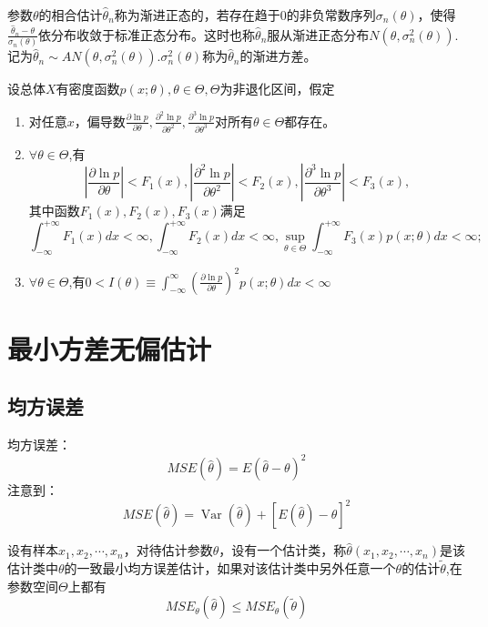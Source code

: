 \begin{definition}
    参数$\theta$的相合估计$\hat{\theta}_n$称为渐进正态的，若存在趋于$0$的非负常数序列$\sigma_n(\theta)$，使得$\frac{\hat{\theta}_n-\theta}{\sigma_n(\theta)}$依分布收敛于标准正态分布。这时也称$\hat{\theta}_n$服从渐进正态分布$N(\theta,\sigma_n^2(\theta))$.记为$\hat\theta_n \sim AN(\theta,\sigma_n^2(\theta))$.$\sigma_n^2(\theta)$称为$\hat{\theta}_n$的渐进方差。
\end{definition}
\begin{theorem}
    设总体$X$有密度函数$p(x;\theta),\theta \in \Theta,\Theta$为非退化区间，假定
    \begin{enumerate}[(1)]
        \item 对任意$x$，偏导数$\frac{\partial \ln p}{\partial \theta},\frac{\partial^2 \ln p}{\partial \theta^2},\frac{\partial^3 \ln p}{\partial \theta^3}$对所有$\theta \in \Theta$都存在。
        \item $\forall \theta \in \Theta$,有
              $$
                  |\frac{\partial \ln p}{\partial \theta}|<F_1(x),
                  |\frac{\partial^2 \ln p}{\partial \theta^2}|<F_2(x),
                  |\frac{\partial^3 \ln p}{\partial \theta^3}|<F_3(x),
              $$
              其中函数$F_1(x),F_2(x),F_3(x)$满足
              $$
                  \int_{-\infty}^{+\infty}F_1(x)dx<\infty,
                  \int_{-\infty}^{+\infty}F_2(x)dx<\infty,
                  \sup\limits_{\theta \in \Theta} \int_{-\infty}^{+\infty}F_3(x)p(x;\theta)dx<\infty;
              $$
        \item $\forall \theta \in \Theta$,有$0< I(\theta)\equiv \int_{-\infty}^{\infty}(\frac{\partial \ln p}{\partial \theta})^2p(x;\theta)dx < \infty$
    \end{enumerate}
\end{theorem}

\section{最小方差无偏估计}
\subsection{均方误差}
均方误差：
\begin{equation}
    MSE(\hat{\theta})=E(\hat{\theta}-\theta)^2
\end{equation}
注意到：
$$
    MSE(\hat\theta)=\operatorname{Var}(\hat\theta)+[E(\hat\theta)-\theta]^2
$$

\begin{definition}
    设有样本$x_1,x_2,\cdots,x_n$，对待估计参数$\theta$，设有一个估计类，称$\hat{\theta}(x_1,x_2,\cdots,x_n)$是该估计类中$\theta$的一致最小均方误差估计，如果对该估计类中另外任意一个$\theta$的估计$\tilde{\theta}$,在参数空间$\Theta$上都有
    $$
        MSE_{\theta}(\hat{\theta}) \leq MSE_{\theta}(\tilde{\theta})
    $$
\end{definition}
